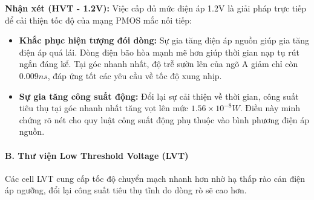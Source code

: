 \documentclass[12pt, a4paper, oneside]{article}
\begin{document}
\textbf{Nhận xét (HVT - 1.2V):} Việc cấp đủ mức điện áp 1.2V là giải pháp trực tiếp để cải thiện tốc độ của mạng PMOS mắc nối tiếp:
\begin{itemize}
    \item \textbf{Khắc phục hiện tượng đói dòng:} Sự gia tăng điện áp nguồn giúp gia tăng điện áp quá lái. Dòng điện bão hòa mạnh mẽ hơn giúp thời gian nạp tụ rút ngắn đáng kể. Tại góc nhanh nhất, độ trễ sườn lên của ngõ A giảm chỉ còn $0.009ns$, đáp ứng tốt các yêu cầu về tốc độ xung nhịp.
    \item \textbf{Sự gia tăng công suất động:} Đổi lại sự cải thiện về thời gian, công suất tiêu thụ tại góc nhanh nhất tăng vọt lên mức $1.56 \times 10^{-8}W$. Điều này minh chứng rõ nét cho quy luật công suất động phụ thuộc vào bình phương điện áp nguồn.
\end{itemize}

\paragraph{B. Thư viện Low Threshold Voltage (LVT)}
Các cell LVT cung cấp tốc độ chuyển mạch nhanh hơn nhờ hạ thấp rào cản điện áp ngưỡng, đổi lại công suất tiêu thụ tĩnh do dòng rò sẽ cao hơn.

\begin{table}[H]
\centering
\renewcommand{\arraystretch}{1.3}

\caption{Tổng hợp thông số Diện tích, Công suất và Độ trễ của NOR2 (LVT).}
\label{tab:exp1_nor2_lvt_params}

\end{table}
\end{document}
